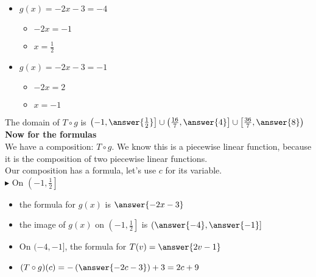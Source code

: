 \documentclass{ximera}
\begin{document}
\begin{itemize}
\item $g(x) = -2x-3 = -4$
\begin{itemize}
\item $-2x = -1$
\item $x = \frac{1}{2}$
\end{itemize}
\end{itemize}

\begin{itemize}
\item $g(x) = -2x-3 = -1$
\begin{itemize}
\item $-2x = 2$
\item $x = -1$
\end{itemize}
\end{itemize}





The domain of $T \circ g$ is $\left( -1, \answer{\frac{1}{2}} \right] \cup \left( \frac{16}{7}, \answer{4} \right] \cup \left[ \frac{36}{7}, \answer{8} \right)$ \\


\textbf{Now for the formulas} \\


We have a composition: $T \circ g$.  We know this is a piecewise linear function, because it is the composition of two piecewise linear functions. \\

Our composition has a formula, let's use $c$ for its variable. \\





$\blacktriangleright$ On $\left( -1, \frac{1}{2} \right]$




\begin{itemize}

\item the formula for $g(x)$ is $\answer{-2x-3}$
\item the image of $g(x)$ on $\left( -1, \frac{1}{2} \right]$ is $\left( \answer{-4}, \answer{-1} \right]$
\item On $( -4, -1 ]$, the formula for $T(v) = \answer{2v-1}$  \\
\item $(T \circ g)(c) = -\left(\answer{-2c-3}\right) + 3 = 2c +9$ \\


\end{itemize}
\end{document}
